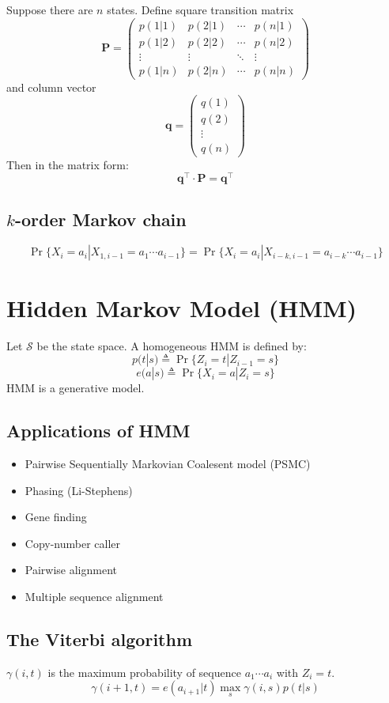 \documentclass[10pt]{article}
\begin{document}
Suppose there are $n$ states. Define square transition matrix
$$
\mathbf{P}=\left(\begin{array}{cccc}
p(1|1) & p(2|1) & \cdots & p(n|1) \\
p(1|2) & p(2|2) & \cdots & p(n|2) \\
\vdots & \vdots & \ddots & \vdots \\
p(1|n) & p(2|n) & \cdots & p(n|n)
\end{array}\right)
$$
and column vector
$$
\mathbf{q}=\left(\begin{array}{c}
q(1) \\
q(2) \\
\vdots\\
q(n)
\end{array}\right)
$$
Then in the matrix form:
$$
\mathbf{q}^\intercal\cdot\mathbf{P}=\mathbf{q}^\intercal
$$

\subsection{$k$-order Markov chain}
$$
\Pr\{X_i=a_i|X_{1,i-1}=a_1\cdots a_{i-1}\}=\Pr\{X_i=a_i|X_{i-k,i-1}=a_{i-k}\cdots a_{i-1}\}
$$

\newpage

\section{Hidden Markov Model (HMM)}
Let $\mathcal{S}$ be the state space. A homogeneous HMM is defined by:
$$
p(t|s)\triangleq\Pr\{Z_i=t|Z_{i-1}=s\}
$$
$$
e(a|s)\triangleq\Pr\{X_i=a|Z_i=s\}
$$
HMM is a generative model.

\subsection{Applications of HMM}

\begin{itemize}
\item Pairwise Sequentially Markovian Coalesent model (PSMC)
\item Phasing (Li-Stephens)
\item Gene finding
\item Copy-number caller
\item Pairwise alignment
\item Multiple sequence alignment
\end{itemize}

\subsection{The Viterbi algorithm}
$\gamma(i,t)$ is the maximum probability of sequence $a_1\cdots a_i$ with $Z_i=t$.
$$
\gamma(i+1,t)=e(a_{i+1}|t)\max_s\gamma(i,s)p(t|s)
$$
\end{document}

